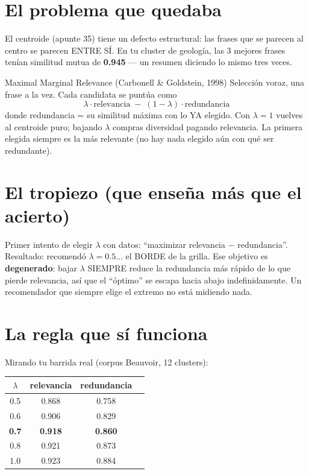 \documentclass[11pt,a4paper]{article}
\begin{document}

\section{El problema que quedaba}

El centroide (apunte 35) tiene un defecto estructural: las frases que se parecen al
centro se parecen ENTRE SÍ. En tu cluster de geología, las 3 mejores frases tenían
similitud mutua de \textbf{0.945} --- un resumen diciendo lo mismo tres veces.

\begin{concepto}{Maximal Marginal Relevance (Carbonell \& Goldstein, 1998)}
Selección voraz, una frase a la vez. Cada candidata se puntúa como
\[
\lambda \cdot \mathrm{relevancia} \;-\; (1-\lambda) \cdot \mathrm{redundancia}
\]
donde redundancia = su similitud máxima con lo YA elegido. Con $\lambda = 1$ vuelves al
centroide puro; bajando $\lambda$ compras diversidad pagando relevancia. La primera
elegida siempre es la más relevante (no hay nada elegido aún con qué ser redundante).
\end{concepto}

\section{El tropiezo (que enseña más que el acierto)}

Primer intento de elegir $\lambda$ con datos: ``maximizar relevancia $-$ redundancia''.
Resultado: recomendó $\lambda = 0.5$... el BORDE de la grilla. Ese objetivo es
\textbf{degenerado}: bajar $\lambda$ SIEMPRE reduce la redundancia más rápido de lo que
pierde relevancia, así que el ``óptimo'' se escapa hacia abajo indefinidamente. Un
recomendador que siempre elige el extremo no está midiendo nada.

\section{La regla que sí funciona}

Mirando tu barrida real (corpus Beauvoir, 12 clusters):

\begin{center}
\begin{tabular}{cccc}
$\lambda$ & relevancia & redundancia \\
\hline
0.5 & 0.868 & 0.758 \\
0.6 & 0.906 & 0.829 \\
\textbf{0.7} & \textbf{0.918} & \textbf{0.860} \\
0.8 & 0.921 & 0.873 \\
1.0 & 0.923 & 0.884 \\
\end{tabular}
\end{center}
\end{document}
